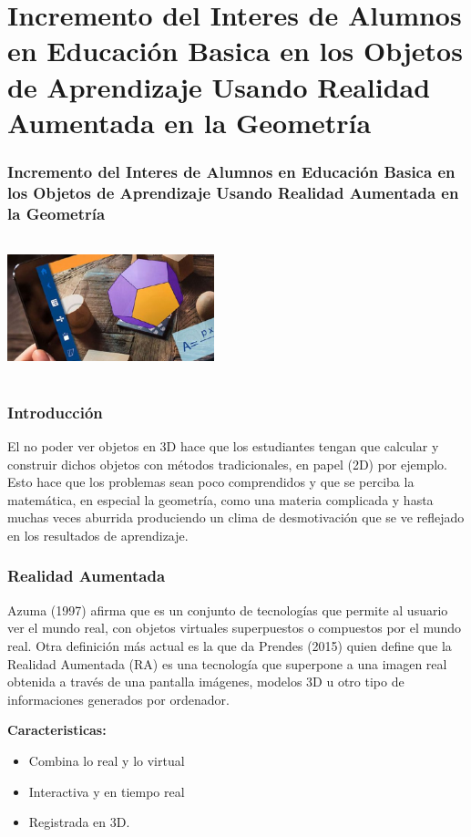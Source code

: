 \documentclass[11pt]{beamer}
\begin{document}
\section{Incremento del Interes de Alumnos en Educación Basica en los Objetos de Aprendizaje Usando Realidad Aumentada en la Geometría}
\begin{frame}
\frametitle{\center Incremento del Interes de Alumnos en Educación Basica en los Objetos de Aprendizaje Usando Realidad Aumentada en la Geometría}
\center \includegraphics[width=6cm, height=4cm]{img/RA.png} \center
\end{frame}

\begin{frame}
\frametitle{Introducción}
El no poder ver objetos en 3D  hace que los estudiantes tengan que calcular y construir  dichos objetos con métodos tradicionales, en papel (2D) por ejemplo. Esto hace que los problemas sean poco comprendidos y que se perciba la matemática, en especial la geometría, como una materia complicada y hasta muchas veces aburrida produciendo un clima de desmotivación que se ve reflejado en  los resultados de aprendizaje.

\end{frame}

\begin{frame}
\frametitle{Realidad Aumentada}

Azuma (1997) afirma que es un conjunto de tecnologías que permite al usuario ver el mundo real, con objetos virtuales superpuestos o compuestos por el mundo real. Otra definición más actual es la que da Prendes (2015) quien define que la Realidad Aumentada (RA) es una tecnología que superpone a una imagen real obtenida a través de una pantalla imágenes, modelos 3D u otro tipo de informaciones generados por ordenador.

\textbf{}

\textbf{Caracteristicas:}

\begin{itemize}
\item Combina lo real y lo virtual
\item Interactiva y en tiempo real
\item Registrada en 3D.
\end{itemize}
\end{frame}
\end{document}
